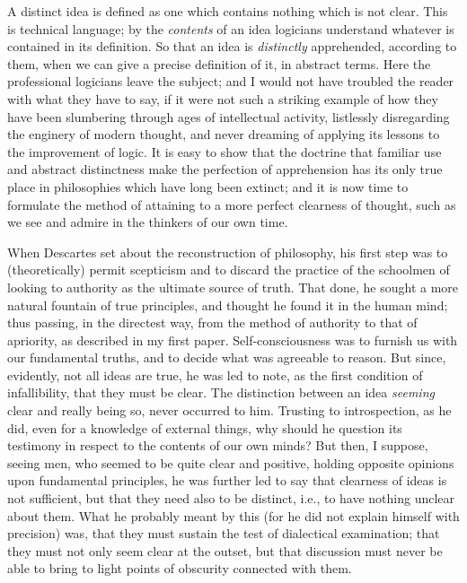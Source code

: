 \documentclass[]{article}
\begin{document}
A distinct idea is defined as one which contains nothing which is not clear. This is technical language; by the \emph{contents} of an idea logicians understand whatever is contained in its definition. So that an idea is \emph{distinctly} apprehended, according to them, when we can give a precise definition of it, in abstract terms. Here the professional logicians leave the subject; and I would not have troubled the reader with what they have to say, if it were not such a striking example of how they have been slumbering through ages of intellectual activity, listlessly disregarding the enginery of modern thought, and never dreaming of applying its lessons to the improvement of logic. It is easy to show that the doctrine that familiar use and abstract distinctness make the perfection of apprehension has its only true place in philosophies which have long been extinct; and it is now time to formulate the method of attaining to a more perfect clearness of thought, such as we see and admire in the thinkers of our own time.

When Descartes set about the reconstruction of philosophy, his first step was to (theoretically) permit scepticism and to discard the practice of the schoolmen of looking to authority as the ultimate source of truth. That done, he sought a more natural fountain of true  principles, and thought he found it in the human mind; thus passing, in the directest way, from the method of authority to that of apriority, as described in my first paper. Self-consciousness was to furnish us with our fundamental truths, and to decide what was agreeable to reason. But since, evidently, not all ideas are true, he was led to note, as the first condition of infallibility, that they must be clear. The distinction between an idea \emph{seeming} clear and really being so, never occurred to him.  Trusting to introspection, as he did, even for a knowledge of external things, why should he question its testimony in respect to the contents of our own minds? But then, I suppose, seeing men, who seemed to be quite clear and positive, holding opposite opinions upon fundamental principles, he was further led to say that clearness of ideas is not sufficient, but that they need also to be distinct, i.e., to have nothing unclear about them. What he probably meant by this (for he did not explain himself with precision) was, that they must sustain the test of dialectical examination; that they must not only seem clear at the outset, but that discussion must never be able to bring to light points of obscurity connected with them.
\end{document}
